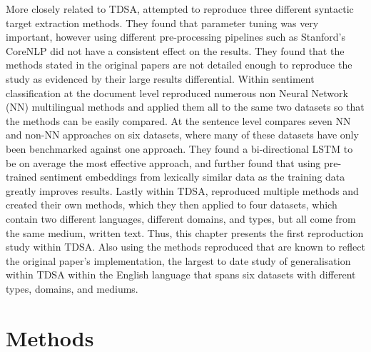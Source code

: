 More closely related to TDSA, \citet{marrese-taylor-matsuo-2017-replication} attempted to reproduce three different syntactic target extraction methods. They found that parameter tuning was very important, however using different pre-processing pipelines such as Stanford's CoreNLP did not have a consistent effect on the results. They found that the methods stated in the original papers are not detailed enough to reproduce the study as evidenced by their large results differential. Within sentiment classification at the document level \citet{dashtipour2016multilingual} reproduced numerous non Neural Network (NN) multilingual methods and applied them all to the same two datasets so that the methods can be easily compared. At the sentence level \citet{barnes-etal-2017-assessing} compares seven NN and non-NN approaches on six datasets, where many of these datasets have only been benchmarked against one approach. They found a bi-directional LSTM to be on average the most effective approach, and further found that using pre-trained sentiment embeddings from lexically similar data as the training data greatly improves results. Lastly within TDSA, \citet{chen-etal-2017-recurrent} reproduced multiple methods and created their own methods, which they then applied to four datasets, which contain two different languages, different domains, and types, but all come from the same medium, written text. Thus, this chapter presents the first reproduction study within TDSA. Also using the methods reproduced that are known to reflect the original paper's implementation, the largest to date study of generalisation within TDSA within the English language that spans six datasets with different types, domains, and mediums.


\FloatBarrier
\section{Methods}
\label{section:repro_methods}


